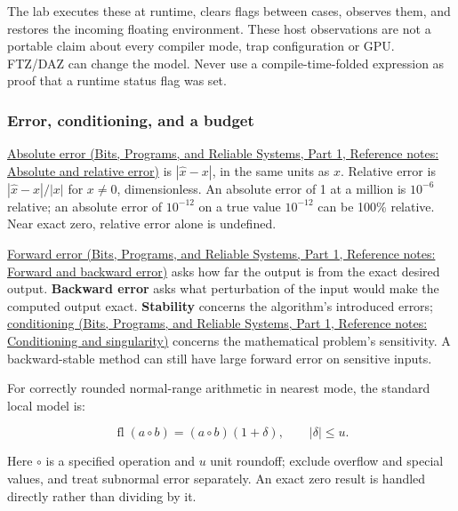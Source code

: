 The lab executes these at runtime, clears flags between cases, observes them, and restores the incoming floating environment. These host observations are not a portable claim about every compiler mode, trap configuration or GPU. FTZ/DAZ can change the model. Never use a compile-time-folded expression as proof that a runtime status flag was set.

\subsubsection{Error, conditioning, and a budget}\label{05-engine-i-ch001-error-conditioning-and-a-budget}

\hypertarget{05-engine-i-ch001-error-conditioning-and-a-budget}{}

\href{../01-Bits-Programs-and-Reliable-Systems-P01/main.pdf\#nameddest=appendix-3ae74e89b4e6}{Absolute error (Bits, Programs, and Reliable Systems, Part 1, Reference notes: Absolute and relative error)} is \(|\widehat x-x|\), in the same units as \(x\). Relative error is \(|\widehat x-x|/|x|\) for \(x\ne0\), dimensionless. An absolute error of 1 at a million is \(10^{-6}\) relative; an absolute error of \(10^{-12}\) on a true value \(10^{-12}\) can be 100\% relative. Near exact zero, relative error alone is undefined.

\href{../01-Bits-Programs-and-Reliable-Systems-P01/main.pdf\#nameddest=appendix-a7fbaf6d1b1c}{Forward error (Bits, Programs, and Reliable Systems, Part 1, Reference notes: Forward and backward error)} asks how far the output is from the exact desired output. \textbf{Backward error} asks what perturbation of the input would make the computed output exact. \textbf{Stability} concerns the algorithm's introduced errors; \href{../01-Bits-Programs-and-Reliable-Systems-P01/main.pdf\#nameddest=appendix-8f6a01f284a7}{conditioning (Bits, Programs, and Reliable Systems, Part 1, Reference notes: Conditioning and singularity)} concerns the mathematical problem's sensitivity. A backward-stable method can still have large forward error on sensitive inputs.

For correctly rounded normal-range arithmetic in nearest mode, the standard local model is:

\[
\operatorname{fl}(a\circ b)=(a\circ b)(1+\delta),\qquad |\delta|\le u.
\]

Here \(\circ\) is a specified operation and \(u\) unit roundoff; exclude overflow and special values, and treat subnormal error separately. An exact zero result is handled directly rather than dividing by it.

